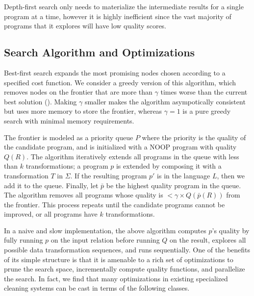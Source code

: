 
 Depth-first search only needs to materialize the intermediate results for a single program at a time, however it is highly inefficient since the vast majority of programs that it explores will have low quality scores.  


\subsection{Search Algorithm and Optimizations}
Best-first search expands the most promising nodes chosen according to a specified cost function.
We consider a greedy version of this algorithm, which removes nodes on the frontier that are more than $\gamma$ times worse than the current best solution ().
Making $\gamma$ smaller makes the algorithm asympotically consistent but uses more memory to store the frontier, whereas $\gamma=1$ is a pure greedy search with minimal memory requirements.  

The frontier is modeled as a priority queue $P$ where the priority is the quality of the candidate program, and is initialized with a NOOP program with quality $Q(R)$.  
The algorithm iteratively extends all programs in the queue with less than $k$ transformations; a program $p$ is extended by composing it with a transformation $T$ in $\Sigma$.  If the resulting program $p'$ is in the language $L$, then we add it to the queue.
Finally, let $\bar{p}$ be the highest quality program in the queue.  The algorithm removes all programs whose quality is $<\gamma\times Q(\bar{p}(R))$ from the frontier.  
This process repeats until the candidate programs cannot be improved, or all programs have $k$ transformations.

In a naive and slow implementation, the above algorithm computes $p$'s quality by fully running $p$ on the input relation before running $Q$ on the result, explores all possible data transformation sequences, and runs sequentially.  One of the benefits of its simple structure is that it is amenable to a rich set of optimizations to prune the search space, incrementally compute quality functions, and parallelize the search.  In fact, we find that many optimizations in existing specialized cleaning systems can be cast in terms of the following classes.


